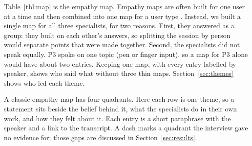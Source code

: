 \documentclass{article}
\begin{document}
Table~\ref{tbl:map} is the empathy map. Empathy maps are often built for
one user at a time and then combined into one map for a user type
\cite{gibbons2018empathy}. Instead, we built a single map for all three
specialists, for two reasons. First, they answered as a group: they built on each other's
answers, so splitting the session by person would separate points that were
made together. Second, the specialists did not speak equally. P3 spoke on one
topic (pen or finger input), so a map for P3 alone would have about two
entries. Keeping one map, with every entry labelled by speaker, shows who said
what without three thin maps. Section~\ref{sec:themes} shows who led each
theme.

A classic empathy map has four quadrants. Here each row is one theme, so a statement sits beside the belief
behind it, what the specialists do in their own work, and how they felt about
it. Each entry is a short paraphrase with the speaker and a link to the
transcript. A dash marks a quadrant the interview gave no evidence for; those
gaps are discussed in Section~\ref{sec:results}.
\end{document}
